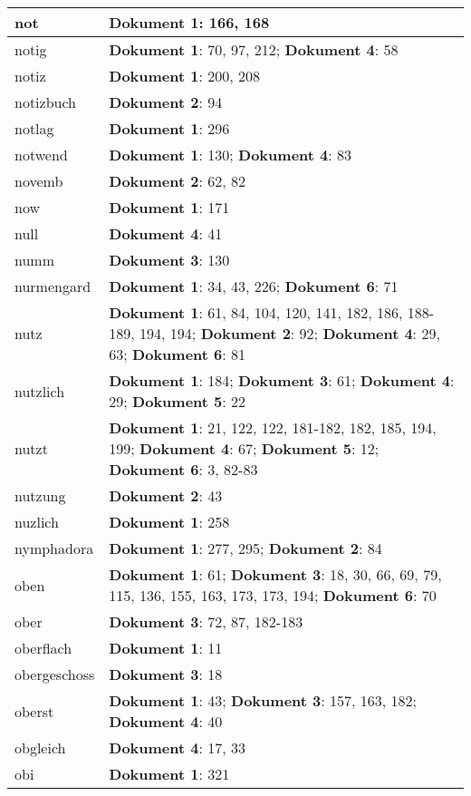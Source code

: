 \documentclass[a5paper]{article}
\begin{document}
\begin{longtable}[l]{|l|p{3in}|}
\hline
not & \textbf{Dokument 1}: 166, 168 \\
\hline
notig & \textbf{Dokument 1}: 70, 97, 212; \textbf{Dokument 4}: 58 \\
\hline
notiz & \textbf{Dokument 1}: 200, 208 \\
\hline
notizbuch & \textbf{Dokument 2}: 94 \\
\hline
notlag & \textbf{Dokument 1}: 296 \\
\hline
notwend & \textbf{Dokument 1}: 130; \textbf{Dokument 4}: 83 \\
\hline
novemb & \textbf{Dokument 2}: 62, 82 \\
\hline
now & \textbf{Dokument 1}: 171 \\
\hline
null & \textbf{Dokument 4}: 41 \\
\hline
numm & \textbf{Dokument 3}: 130 \\
\hline
nurmengard & \textbf{Dokument 1}: 34, 43, 226; \textbf{Dokument 6}: 71 \\
\hline
nutz & \textbf{Dokument 1}: 61, 84, 104, 120, 141, 182, 186, 188-189, 194, 194; \textbf{Dokument 2}: 92; \textbf{Dokument 4}: 29, 63; \textbf{Dokument 6}: 81 \\
\hline
nutzlich & \textbf{Dokument 1}: 184; \textbf{Dokument 3}: 61; \textbf{Dokument 4}: 29; \textbf{Dokument 5}: 22 \\
\hline
nutzt & \textbf{Dokument 1}: 21, 122, 122, 181-182, 182, 185, 194, 199; \textbf{Dokument 4}: 67; \textbf{Dokument 5}: 12; \textbf{Dokument 6}: 3, 82-83 \\
\hline
nutzung & \textbf{Dokument 2}: 43 \\
\hline
nuzlich & \textbf{Dokument 1}: 258 \\
\hline
nymphadora & \textbf{Dokument 1}: 277, 295; \textbf{Dokument 2}: 84 \\
\hline
oben & \textbf{Dokument 1}: 61; \textbf{Dokument 3}: 18, 30, 66, 69, 79, 115, 136, 155, 163, 173, 173, 194; \textbf{Dokument 6}: 70 \\
\hline
ober & \textbf{Dokument 3}: 72, 87, 182-183 \\
\hline
oberflach & \textbf{Dokument 1}: 11 \\
\hline
obergeschoss & \textbf{Dokument 3}: 18 \\
\hline
oberst & \textbf{Dokument 1}: 43; \textbf{Dokument 3}: 157, 163, 182; \textbf{Dokument 4}: 40 \\
\hline
obgleich & \textbf{Dokument 4}: 17, 33 \\
\hline
obi & \textbf{Dokument 1}: 321 \\

\end{longtable}
\end{document}
